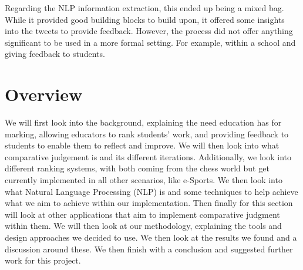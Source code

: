 		Regarding the NLP information extraction, this ended up being a mixed bag. While it provided good building blocks to build upon, it offered some insights into the tweets to provide feedback. However, the process did not offer anything significant to be used in a more formal setting. For example, within a school and giving feedback to students.
	
	\section{Overview}  
	\label{sec:intro_overview} 
	 We will first look into the background, explaining the need education has for marking, allowing educators to rank students' work, and providing feedback to students to enable them to reflect and improve. We will then look into what comparative judgement is and its different iterations. Additionally, we look into different ranking systems, with both coming from the chess world but get currently implemented in all other scenarios, like e-Sports. We then look into what Natural Language Processing (NLP) is and some techniques to help achieve what we aim to achieve within our implementation. Then finally for this section will look at other applications that aim to implement comparative judgment within them. We will then look at our methodology, explaining the tools and design approaches we decided to use. We then look at the results we found and a discussion around these. We then finish with a conclusion and suggested further work for this project.
